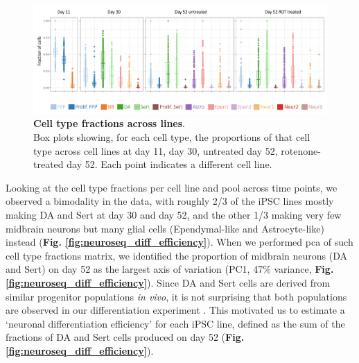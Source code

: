 \begin{figure}[h]
\includegraphics[width=15.5cm]{Chapter5/Fig/neuroseq_line_celltype.png}
\caption[Cell type fractions across lines]{\textbf{Cell type fractions across lines}.\\
Box plots showing, for each cell type, the proportions of that cell type across cell lines at day 11, day 30, untreated day 52, rotenone-treated day 52. 
Each point indicates a different cell line.}
\label{fig:neuroseq_line_variation}
\end{figure}


Looking at the cell type fractions per cell line and pool across time points, we observed a bimodality in the data, with roughly 2/3 of the iPSC lines mostly making DA and Sert at day 30 and day 52, and the other 1/3 making very few midbrain neurons but many glial cells (Ependymal-like and Astrocyte-like) instead (\textbf{Fig. \ref{fig:neuroseq_diff_efficiency}}).
When we performed \gls{pca} of such cell type fractions matrix, we identified the proportion of midbrain neurons (DA and Sert) on day 52 as the largest axis of variation (PC1, 47\% variance, \textbf{Fig. \ref{fig:neuroseq_diff_efficiency}}). 
Since DA and Sert cells are derived from similar progenitor populations \textit{in vivo}, it is not surprising that both populations are observed in our differentiation experiment \cite{ye1998fgf, cao2017characterization}. 
This motivated us to estimate a `neuronal differentiation efficiency' for each iPSC line, defined as the sum of the fractions of DA and Sert cells produced on day 52 (\textbf{Fig. \ref{fig:neuroseq_diff_efficiency}}). 
\\

